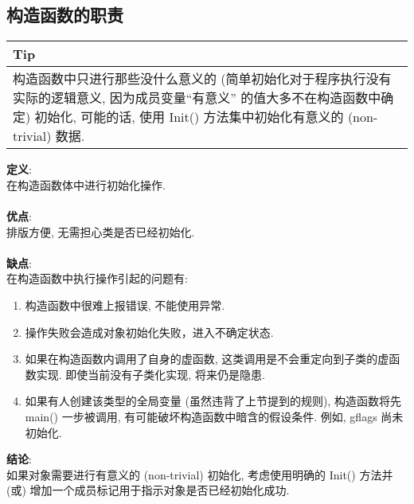 \documentclass[a4paper,11pt,CJK]{article}
\begin{document}
\begin{CJK}{UTF8}{gbsn}
\subsection{构造函数的职责}
\begin{table}[htbp]
\flushleft
\begin{tabular}{p{400pt}}
\toprule
\rowcolor[gray]{.8} Tip \\
\midrule
构造函数中只进行那些没什么意义的 (简单初始化对于程序执行没有实际的逻辑意义, 因为成员变量``有意义'' 的值大多不在构造函数中确定) 初始化, 可能的话, 使用 Init() 方法集中初始化有意义的 (non-trivial) 数据.
\\
\bottomrule
\end{tabular}
\end{table}
\noindent
\textbf{定义}:\\
\indent 在构造函数体中进行初始化操作.\\
\\
\textbf{优点}:\\
\indent 排版方便, 无需担心类是否已经初始化.\\
\\
\textbf{缺点}:\\
\indent 在构造函数中执行操作引起的问题有:
\begin{enumerate}
    \item 构造函数中很难上报错误, 不能使用异常.
    \item 操作失败会造成对象初始化失败，进入不确定状态.
    \item 如果在构造函数内调用了自身的虚函数, 这类调用是不会重定向到子类的虚函数实现. 即使当前没有子类化实现, 将来仍是隐患.
    \item 如果有人创建该类型的全局变量 (虽然违背了上节提到的规则), 构造函数将先 main() 一步被调用, 有可能破坏构造函数中暗含的假设条件. 例如, gflags 尚未初始化.
\end{enumerate}
\noindent
\textbf{结论}:\\
\indent 如果对象需要进行有意义的 (non-trivial) 初始化, 考虑使用明确的 Init() 方法并 (或) 增加一个成员标记用于指示对象是否已经初始化成功.\\


\end{CJK}
\end{document}
